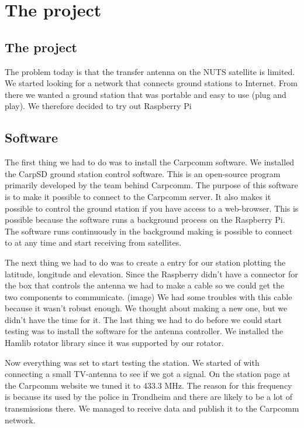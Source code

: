 \chapter{The project}
\label{chap:the_project}


\section {The project}

The problem today is that the transfer antenna on the NUTS satellite is limited. We started looking for a network that connects ground stations to Internet. From there we wanted a ground station that was portable and easy to use (plug and play). We therefore decided to try out Raspberry Pi 

\section {Software}

The first thing we had to do was to install the Carpcomm software. We installed the CarpSD ground station control software. This is an open-source program primarily developed by the team behind Carpcomm. The purpose of this software is to make it possible to connect to the Carpcomm server. It also makes it possible to control the ground station if you have access to a web-browser. This is possible because the software runs a background process on the Raspberry Pi. The software runs continuously in the background making is possible to connect to at any time and start receiving from satellites. 

The next thing we had to do was to create a entry for our station plotting the latitude, longitude and elevation.    
Since the Raspberry didn’t have a connector for the box that controls the antenna we had to make a cable so we could get the two components to communicate. (image) 
We had some troubles with this cable because it wasn't robust enough. We thought about making a new one, but we didn't have the time for it. 
The last thing we had to do before we could start testing was to install the software for the antenna controller. We installed the Hamlib rotator library since it was supported by our rotator. 

Now everything was set to start testing the station. We started of with connecting a small TV-antenna to see if we got a signal. On the station page at the Carpcomm website we tuned it to 433.3 MHz. The reason for this  frequency is because its used by the police in Trondheim and there are likely to be a lot of transmissions there.  We managed to receive data and publish it to the Carpcomm network.



